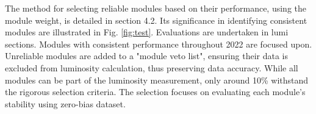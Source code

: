 
The method for selecting reliable modules based on their performance, using the module weight, is detailed in section 4.2. Its significance in identifying consistent modules are illustrated in Fig. \ref{fig:test}. Evaluations are undertaken in lumi sections. Modules with consistent performance throughout 2022 are focused upon. Unreliable modules are added to a "module veto list", ensuring their data is excluded from luminosity calculation, thus preserving data accuracy. While all modules can be part of the luminosity measurement, only around 10\% withstand the rigorous selection criteria. The selection focuses on evaluating each module's stability using zero-bias dataset.

